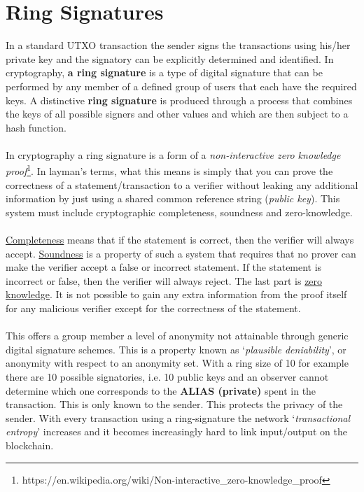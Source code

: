 \section{Ring Signatures}
In a standard UTXO transaction the sender signs the transactions using his/her
private key and the signatory can be explicitly determined and identified. In
cryptography, \textbf{a ring signature} is a type of digital signature that can be
performed by any member of a defined group of users that each have the required
keys. A distinctive \textbf{ring signature} is produced through a process that combines
the keys of all possible signers and other values and which are then subject to
a hash function.
\\
\\
\noindent
In cryptography a ring signature is a form of a \textit{non-interactive 
zero knowledge proof}\footnote{https://en.wikipedia.org/wiki/Non-interactive\_zero-knowledge\_proof}. 
In layman’s terms, what this means is simply that you can prove the
correctness of a statement/transaction to a verifier without leaking any additional
information by just using a shared common reference string (\textit{public key}).
This system must include cryptographic completeness, soundness and zero-knowledge.
\\
\\
\noindent
\underline{Completeness} means that if the statement is correct, then the verifier will
always accept. \underline{Soundness} is a property of such a system that requires that
no prover can make the verifier accept a false or incorrect statement. If the
statement is incorrect or false, then the verifier will always reject. The
last part is \underline{zero knowledge}. It is not possible to gain any extra information
from the proof itself for any malicious verifier except for the correctness of
the statement.
\\
\\
\noindent
This offers a group member a level of anonymity not attainable through generic
digital signature schemes. This is a property known as ‘\textit{plausible deniability}’,
or anonymity with respect to an anonymity set. With a ring size of 10 for example
there are 10 possible signatories, i.e. 10 public keys and an observer cannot
determine which one corresponds to the \textbf{ALIAS (private)} spent in the transaction. This
is only known to the sender. This protects the privacy of the sender. With every
transaction using a ring-signature the network ‘\textit{transactional entropy}’ increases
and it becomes increasingly hard to link input/output on the blockchain.
